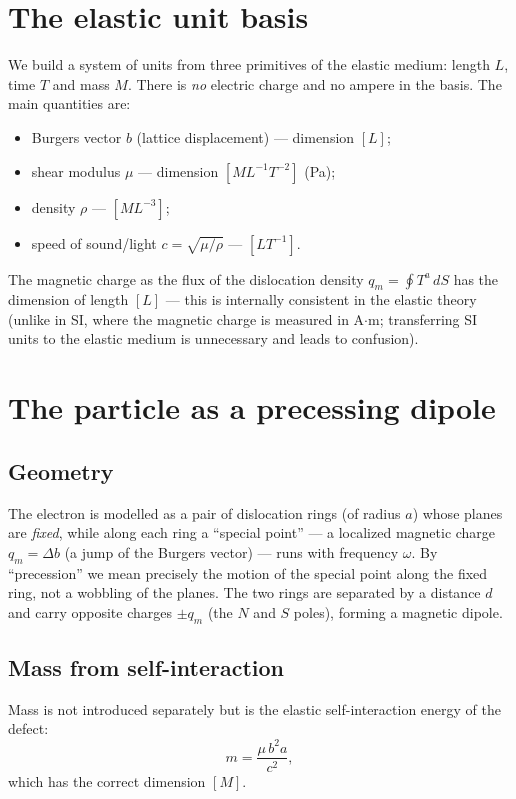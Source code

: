 \documentclass[12pt,a4paper]{article}
\begin{document}
\section{The elastic unit basis}
\label{sec:units}
We build a system of units from three primitives of the elastic medium: length
$L$, time $T$ and mass $M$. There is \emph{no} electric charge and no ampere in
the basis. The main quantities are:
\begin{itemize}[nosep]
\item Burgers vector $b$ (lattice displacement) --- dimension $[L]$;
\item shear modulus $\mu$ --- dimension $[M L^{-1}T^{-2}]$ (Pa);
\item density $\rho$ --- $[M L^{-3}]$;
\item speed of sound/light $c=\sqrt{\mu/\rho}$ --- $[L T^{-1}]$.
\end{itemize}
The magnetic charge as the flux of the dislocation density
$q_m=\oint T^a\,dS$ has the dimension of length $[L]$ --- this is internally
consistent in the elastic theory (unlike in SI, where the magnetic charge is
measured in A$\cdot$m; transferring SI units to the elastic medium is
unnecessary and leads to confusion).

\section{The particle as a precessing dipole}
\label{sec:particle}

\subsection{Geometry}
The electron is modelled as a pair of dislocation rings (of radius $a$) whose
planes are \emph{fixed}, while along each ring a ``special point'' --- a
localized magnetic charge $q_m=\Delta b$ (a jump of the Burgers vector) ---
runs with frequency $\omega$. By ``precession'' we mean precisely the motion of
the special point along the fixed ring, not a wobbling of the planes. The two
rings are separated by a distance $d$ and carry opposite charges $\pm q_m$
(the $N$ and $S$ poles), forming a magnetic dipole.

\subsection{Mass from self-interaction}
Mass is not introduced separately but is the elastic self-interaction energy of
the defect:
\begin{equation}
m = \frac{\mu\, b^2 a}{c^2},
\end{equation}
which has the correct dimension $[M]$.
\end{document}
